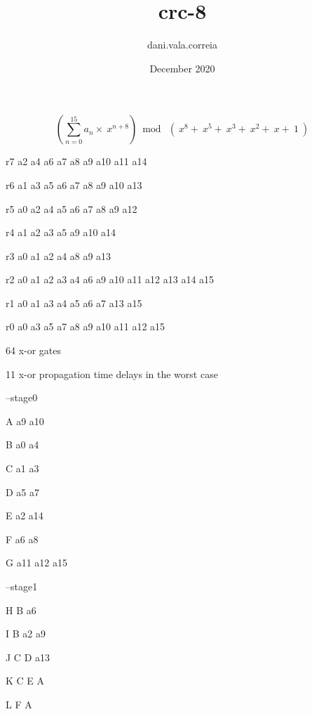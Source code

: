 \documentclass{article}
\title{crc-8}
\author{dani.vala.correia }
\date{December 2020}
\begin{document}
\[\left(\sum ^{15}_{n=0} a_{n} \times \ x^{n+8}\right)\bmod \ \left( \ x^{8} +\ x^{5} +\ x^{3} +\ x^{2} +\ x +\ 1\ \right)\]

\vspace{5mm}
r7 \longleftarrow a2 \oplus a4 \oplus a6 \oplus a7 \oplus a8 \oplus a9 \oplus a10 \oplus a11 \oplus a14 \par
r6 \longleftarrow a1 \oplus a3 \oplus a5 \oplus a6 \oplus a7 \oplus a8 \oplus a9 \oplus a10 \oplus a13 \par
r5 \longleftarrow a0 \oplus a2 \oplus a4 \oplus a5 \oplus a6 \oplus a7 \oplus a8 \oplus a9 \oplus a12 \par
r4 \longleftarrow a1 \oplus a2 \oplus a3 \oplus a5 \oplus a9 \oplus a10 \oplus a14 \par
r3 \longleftarrow a0 \oplus a1 \oplus a2 \oplus a4 \oplus a8 \oplus a9 \oplus a13 \par
r2 \longleftarrow a0 \oplus a1 \oplus a2 \oplus a3 \oplus a4 \oplus a6 \oplus a9 \oplus a10 \oplus a11 \oplus a12 \oplus a13 \oplus a14 \oplus a15 \par
r1 \longleftarrow a0 \oplus a1 \oplus a3 \oplus a4 \oplus a5 \oplus a6 \oplus a7 \oplus a13 \oplus a15 \par
r0 \longleftarrow a0 \oplus a3 \oplus a5 \oplus a7 \oplus a8 \oplus a9 \oplus a10 \oplus a11 \oplus a12 \oplus a15 \par
\vspace{5mm}
64 x-or gates \par
11 x-or propagation time delays in the worst case \par
\vspace{5mm}

--stage0 \par
A \longleftarrow a9 \oplus a10 \par
B \longleftarrow a0 \oplus a4 \par
C \longleftarrow a1 \oplus a3 \par
D \longleftarrow a5 \oplus a7 \par
E \longleftarrow a2 \oplus a14 \par
F \longleftarrow a6 \oplus a8 \par
G \longleftarrow a11 \oplus a12 \oplus a15 \par
\vspace{5mm}

--stage1 \par
H \longleftarrow B \oplus a6 \par
I \longleftarrow B \oplus a2 \oplus a9 \par
J \longleftarrow C \oplus D \oplus a13 \par
K \longleftarrow C \oplus E \oplus A \par
L \longleftarrow F \oplus A \par
\vspace{5mm}
\end{document}
